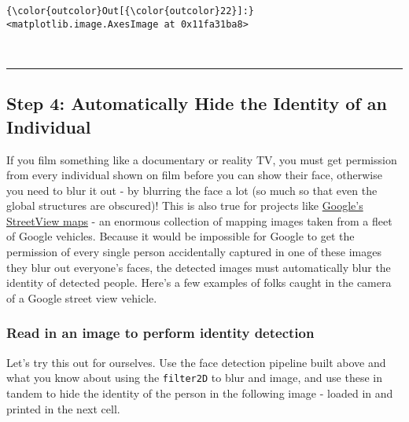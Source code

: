 \documentclass[11pt]{article}
\begin{document}
\begin{Verbatim}[commandchars=\\\{\}]
{\color{outcolor}Out[{\color{outcolor}22}]:} <matplotlib.image.AxesImage at 0x11fa31ba8>
\end{Verbatim}
            
    \begin{center}
    \end{center}
    { \hspace*{\fill} \\}
    
    \begin{center}\rule{0.5\linewidth}{\linethickness}\end{center}

\hypertarget{step-4-automatically-hide-the-identity-of-an-individual}{%
\subsection{Step 4: Automatically Hide the Identity of an
Individual}\label{step-4-automatically-hide-the-identity-of-an-individual}}

If you film something like a documentary or reality TV, you must get
permission from every individual shown on film before you can show their
face, otherwise you need to blur it out - by blurring the face a lot (so
much so that even the global structures are obscured)! This is also true
for projects like \href{https://www.google.com/streetview/}{Google's
StreetView maps} - an enormous collection of mapping images taken from a
fleet of Google vehicles. Because it would be impossible for Google to
get the permission of every single person accidentally captured in one
of these images they blur out everyone's faces, the detected images must
automatically blur the identity of detected people. Here's a few
examples of folks caught in the camera of a Google street view vehicle.

 

    \hypertarget{read-in-an-image-to-perform-identity-detection}{%
\subsubsection{Read in an image to perform identity
detection}\label{read-in-an-image-to-perform-identity-detection}}

Let's try this out for ourselves. Use the face detection pipeline built
above and what you know about using the \texttt{filter2D} to blur and
image, and use these in tandem to hide the identity of the person in the
following image - loaded in and printed in the next cell.
\end{document}

